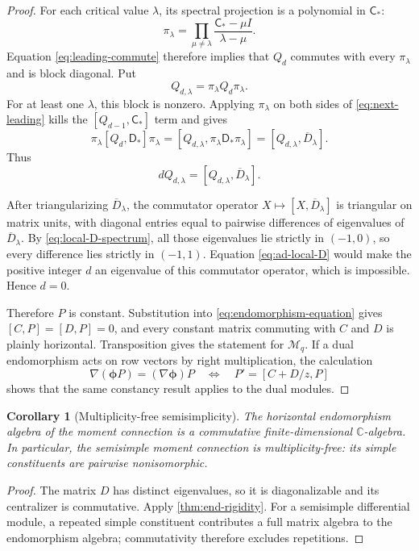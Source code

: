 \documentclass[11pt]{article}
\numberwithin{equation}{section}
\newtheorem{corollary}[corollary]{Corollary}
\theoremstyle{definition}
\theoremstyle{remark}
\newcommand{\C}{\mathbb C}
\newcommand{\Mcal}{\mathcal M}
\begin{document}
\begin{proof}
For each critical value $\lambda$, its spectral projection is a polynomial in
$\mathsf C_*$:
\[
  \pi_\lambda
  =\prod_{\mu\ne\lambda}
    \frac{\mathsf C_*-\mu I}{\lambda-\mu}.
\]
Equation \eqref{eq:leading-commute} therefore implies that $Q_d$ commutes with
every $\pi_\lambda$ and is block diagonal.  Put
\[
  Q_{d,\lambda}=\pi_\lambda Q_d\pi_\lambda.
\]
For at least one $\lambda$, this block is nonzero.  Applying $\pi_\lambda$ on
both sides of \eqref{eq:next-leading} kills the
$[Q_{d-1},\mathsf C_*]$ term and gives
\[
  \pi_\lambda[Q_d,\mathsf D_*]\pi_\lambda
  =[Q_{d,\lambda},\pi_\lambda\mathsf D_*\pi_\lambda]
  =[Q_{d,\lambda},\overline D_\lambda].
\]
Thus
\begin{equation}\label{eq:ad-local-D}
  dQ_{d,\lambda}
  =[Q_{d,\lambda},\overline D_\lambda].
\end{equation}

After triangularizing $\overline D_\lambda$, the commutator operator
$X\mapsto[X,\overline D_\lambda]$ is triangular on matrix units, with diagonal
entries equal to pairwise differences of eigenvalues of
$\overline D_\lambda$.  By \eqref{eq:local-D-spectrum}, all those eigenvalues
lie strictly in $(-1,0)$, so every difference lies strictly in $(-1,1)$.
Equation \eqref{eq:ad-local-D} would make the positive integer $d$ an
eigenvalue of this commutator operator, which is impossible.  Hence $d=0$.

Therefore $P$ is constant.  Substitution into
\eqref{eq:endomorphism-equation} gives $[C,P]=[D,P]=0$, and every constant
matrix commuting with $C$ and $D$ is plainly horizontal.  Transposition gives
the statement for $\Mcal_q$.  If a dual endomorphism acts on row vectors by
right multiplication, the calculation
\[
  \nabla(\boldsymbol\phi P)=(\nabla\boldsymbol\phi)P
  \quad\Longleftrightarrow\quad
  P'=[C+D/z,P]
\]
shows that the same constancy result applies to the dual modules.
\end{proof}

\begin{corollary}[Multiplicity-free semisimplicity]\label{cor:multiplicity-free}
The horizontal endomorphism algebra of the moment connection is a
commutative finite-dimensional $\C$-algebra.  In particular, the semisimple
moment connection is multiplicity-free: its simple constituents are
pairwise nonisomorphic.
\end{corollary}

\begin{proof}
The matrix $D$ has distinct eigenvalues, so it is diagonalizable and its
centralizer is commutative.  Apply \cref{thm:end-rigidity}.  For a semisimple
differential module, a repeated simple constituent contributes a full
matrix algebra to the endomorphism algebra; commutativity therefore excludes
repetitions.
\end{proof}
\end{document}
